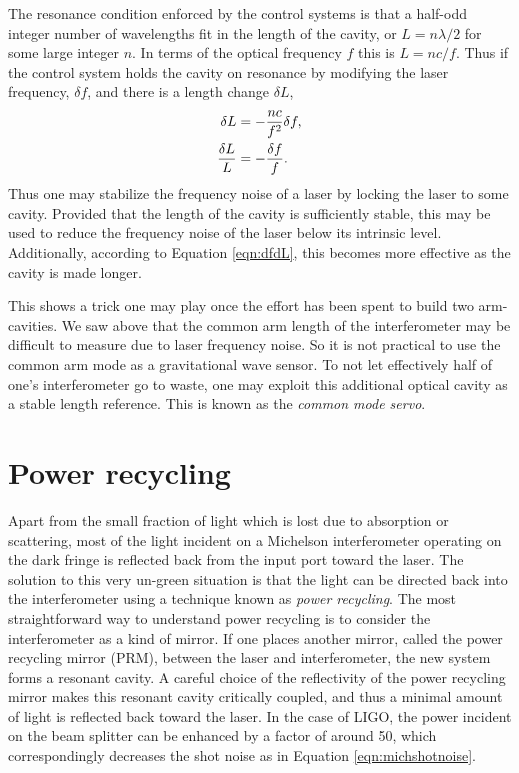 The resonance condition enforced by the control systems is that a half-odd integer number of wavelengths fit in the length of the cavity, or $L=n\lambda/2$ for some large integer $n$. %
In terms of the optical frequency $f$ this is $L=nc/f$. %
Thus if the control system holds the cavity on resonance by modifying the laser frequency, $\delta f$, and there is a length change $\delta L$,
\begin{align}
\delta L &= -\frac{nc}{f^2}\delta f,\notag \\
\frac{\delta L}{L} &= -\frac{\delta f}{f}.
\label{eqn:dfdL}
\end{align}
Thus one may stabilize the frequency noise of a laser by locking the laser to some cavity. %
Provided that the length of the cavity is sufficiently stable, this may be used to reduce the frequency noise of the laser below its intrinsic level. %
Additionally, according to Equation \ref{eqn:dfdL}, this becomes more effective as the cavity is made longer.

This shows a trick one may play once the effort has been spent to build two arm-cavities. %
We saw above that the common arm length of the interferometer may be difficult to measure due to laser frequency noise. %
So it is not practical to use the common arm mode as a gravitational wave sensor. %
To not let effectively half of one's interferometer go to waste, one may exploit this additional optical cavity as a stable length reference. %
This is known as the \emph{common mode servo}.

\section{Power recycling}
Apart from the small fraction of light which is lost due to absorption or scattering, most of the light incident on a Michelson interferometer operating on the dark fringe is reflected back from the input port toward the laser. %
The solution to this very un-green situation is that the light can be directed back into the interferometer using a technique known as \emph{power recycling}. %
The most straightforward way to understand power recycling is to consider the interferometer as a kind of mirror. %
If one places another mirror, called the power recycling mirror (PRM), between the laser and interferometer, the new system forms a resonant cavity. %
A careful choice of the reflectivity of the power recycling mirror makes this resonant cavity critically coupled, and thus a minimal amount of light is reflected back toward the laser. %
In the case of LIGO, the power incident on the beam splitter can be enhanced by a factor of around 50, which correspondingly decreases the shot noise as in Equation \ref{eqn:michshotnoise}. %


